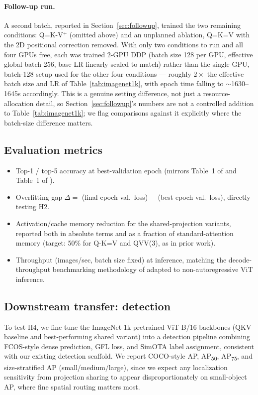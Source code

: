 \documentclass[11pt]{article}
\begin{document}
\paragraph{Follow-up run.} A second batch, reported in
Section~\ref{sec:followup}, trained the two remaining conditions: Q=K-V\(^+\)
(omitted above) and an unplanned ablation, Q=K=V with the 2D positional
correction removed. With only two conditions to run and all four GPUs free,
each was trained 2-GPU DDP (batch size 128 per GPU, effective global batch
256, base LR linearly scaled to match) rather than the single-GPU,
batch-128 setup used for the other four conditions --- roughly
$2\times$ the effective batch size and LR of Table~\ref{tab:imagenet1k}, with
epoch time falling to $\sim$1630--1645s accordingly. This is a genuine
setting difference, not just a resource-allocation detail, so
Section~\ref{sec:followup}'s numbers are not a controlled addition to
Table~\ref{tab:imagenet1k}; we flag comparisons against it explicitly where
the batch-size difference matters.

\subsection{Evaluation metrics}
\begin{itemize}
    \item Top-1 / top-5 accuracy at best-validation epoch (mirrors
    Table~1 of \citet{kayyam2026three} and Table~1 of
    \citet{gao2026keyless}).
    \item Overfitting gap \(\Delta = \) (final-epoch val.\ loss) $-$
    (best-epoch val.\ loss), directly testing H2.
    \item Activation/cache memory reduction for the shared-projection
    variants, reported both in absolute terms and as a fraction of
    standard-attention memory (target: 50\% for Q-K=V and QVV(3), as in
    prior work).
    \item Throughput (images/sec, batch size fixed) at inference,
    matching the decode-throughput benchmarking methodology of
    \citet{gao2026keyless} adapted to non-autoregressive ViT inference.
\end{itemize}

\subsection{Downstream transfer: detection}
\label{sec:transfer}
To test H4, we fine-tune the ImageNet-1k-pretrained ViT-B/16 backbones
(QKV baseline and best-performing shared variant) into a detection
pipeline combining FCOS-style dense prediction, GFL loss, and SimOTA label
assignment, consistent with our existing detection scaffold. We report
COCO-style AP, AP\textsubscript{50}, AP\textsubscript{75}, and
size-stratified AP (small/medium/large), since we expect any localization
sensitivity from projection sharing to appear disproportionately on
small-object AP, where fine spatial routing matters most.
\end{document}
